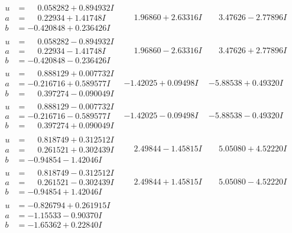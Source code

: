 \documentclass[1p]{elsarticle_modified}
\theoremstyle{definition}
\begin{document}
$$\begin{array}{c|c|c}
\begin{aligned}
u &= \phantom{-}0.058282 + 0.894932 I \\
a &= \phantom{-}0.22934 + 1.41748 I \\
b &= -0.420848 + 0.236426 I\end{aligned}
 & \phantom{-}1.96860 + 2.63316 I & \phantom{-}3.47626 - 2.77896 I \\ \hline\begin{aligned}
u &= \phantom{-}0.058282 - 0.894932 I \\
a &= \phantom{-}0.22934 - 1.41748 I \\
b &= -0.420848 - 0.236426 I\end{aligned}
 & \phantom{-}1.96860 - 2.63316 I & \phantom{-}3.47626 + 2.77896 I \\ \hline\begin{aligned}
u &= \phantom{-}0.888129 + 0.007732 I \\
a &= -0.216716 + 0.589577 I \\
b &= \phantom{-}0.397274 - 0.090049 I\end{aligned}
 & -1.42025 + 0.09498 I & -5.88538 + 0.49320 I \\ \hline\begin{aligned}
u &= \phantom{-}0.888129 - 0.007732 I \\
a &= -0.216716 - 0.589577 I \\
b &= \phantom{-}0.397274 + 0.090049 I\end{aligned}
 & -1.42025 - 0.09498 I & -5.88538 - 0.49320 I \\ \hline\begin{aligned}
u &= \phantom{-}0.818749 + 0.312512 I \\
a &= \phantom{-}0.261521 + 0.302439 I \\
b &= -0.94854 - 1.42046 I\end{aligned}
 & \phantom{-}2.49844 - 1.45815 I & \phantom{-}5.05080 + 4.52220 I \\ \hline\begin{aligned}
u &= \phantom{-}0.818749 - 0.312512 I \\
a &= \phantom{-}0.261521 - 0.302439 I \\
b &= -0.94854 + 1.42046 I\end{aligned}
 & \phantom{-}2.49844 + 1.45815 I & \phantom{-}5.05080 - 4.52220 I \\ \hline\begin{aligned}
u &= -0.826794 + 0.261915 I \\
a &= -1.15533 - 0.90370 I \\
b &= -1.65362 + 0.22840 I\end{aligned}

\end{array}$$
\end{document}
